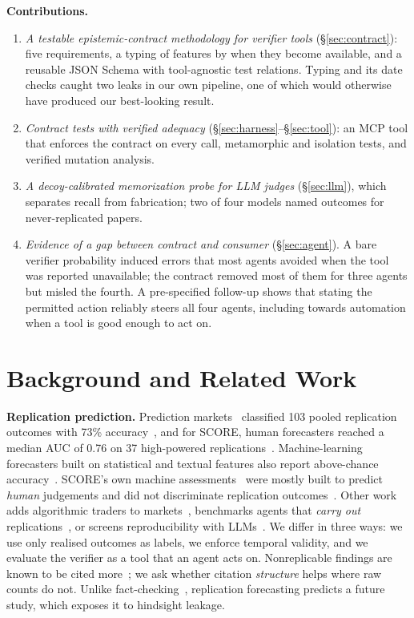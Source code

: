\documentclass[conference]{IEEEtran}
\begin{document}
\textbf{Contributions.}
\begin{enumerate}
\item \emph{A testable epistemic-contract methodology for verifier tools} (\S\ref{sec:contract}): five requirements, a typing of features by when they become available, and a reusable JSON Schema with tool-agnostic test relations. Typing and its date checks caught two leaks in our own pipeline, one of which would otherwise have produced our best-looking result.
\item \emph{Contract tests with verified adequacy} (\S\ref{sec:harness}--\S\ref{sec:tool}): an MCP tool that enforces the contract on every call, metamorphic and isolation tests, and verified mutation analysis.
\item \emph{A decoy-calibrated memorization probe for LLM judges} (\S\ref{sec:llm}), which separates recall from fabrication; two of four models named outcomes for never-replicated papers.
\item \emph{Evidence of a gap between contract and consumer} (\S\ref{sec:agent}). A bare verifier probability induced errors that most agents avoided when the tool was reported unavailable; the contract removed most of them for three agents but misled the fourth. A pre-specified follow-up shows that stating the permitted action reliably steers all four agents, including towards automation when a tool is good enough to act on.
\end{enumerate}
\section{Background and Related Work}
\textbf{Replication prediction.} Prediction markets~\cite{dreber2015} classified 103 pooled replication outcomes with 73\% accuracy~\cite{gordon2021}, and for SCORE, human forecasters reached a median AUC of 0.76 on 37 high-powered replications~\cite{mody2026}. Machine-learning forecasters built on statistical and textual features also report above-chance accuracy~\cite{altmejd2019,yang2020,youyou2023}. SCORE's own machine assessments~\cite{alipourfard2021} were mostly built to predict \emph{human} judgements and did not discriminate replication outcomes~\cite{rajtmajer2026}. Other work adds algorithmic traders to markets~\cite{chakravorti2026hybrid}, benchmarks agents that \emph{carry out} replications~\cite{nguyen2026replicatorbench}, or screens reproducibility with LLMs~\cite{holtdirk2026reproducibility}. We differ in three ways: we use only realised outcomes as labels, we enforce temporal validity, and we evaluate the verifier as a tool that an agent acts on. Nonreplicable findings are known to be cited more~\cite{serragarcia2021}; we ask whether citation \emph{structure} helps where raw counts do not. Unlike fact-checking~\cite{wadden2020}, replication forecasting predicts a future study, which exposes it to hindsight leakage.
\end{document}
